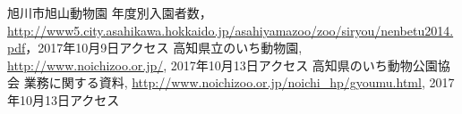 \documentclass[a4j]{jarticle}
\begin{document}

\begin{thebibliography}{9}
旭川市旭山動物園 年度別入園者数，\url{http://www5.city.asahikawa.hokkaido.jp/asahiyamazoo/zoo/siryou/nenbetu2014.pdf}，2017年10月9日アクセス
高知県立のいち動物園, \url{http://www.noichizoo.or.jp/}, 2017年10月13日アクセス  
  高知県のいち動物公園協会 業務に関する資料, \url{http://www.noichizoo.or.jp/noichi_hp/gyoumu.html}, 2017年10月13日アクセス

\end{thebibliography}
\end{document}

